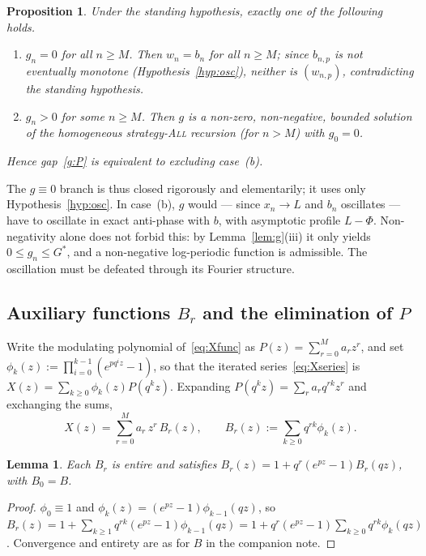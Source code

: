 \documentclass[11pt]{article}
\newtheorem{proposition}[theorem]{Proposition}
\newtheorem{lemma}[theorem]{Lemma}
\theoremstyle{definition}
\newcommand{\All}{\textsc{All}}
\begin{document}
\begin{proposition}\label{prop:dichotomy}
  Under the standing hypothesis, exactly one of the following holds.
  \begin{enumerate}[label=\rm(\alph*),leftmargin=2.4em]
  \item $g_n=0$ for all $n\ge M$. Then $w_n=b_n$ for all $n\ge M$;
    since $b_{n,p}$ is not eventually monotone
    (Hypothesis~\ref{hyp:osc}), neither is $(w_{n,p})$, contradicting
    the standing hypothesis.
  \item $g_n>0$ for some $n\ge M$. Then $g$ is a non-zero,
    non-negative, bounded solution of the homogeneous strategy-\All{}
    recursion (for $n>M$) with $g_0=0$.
  \end{enumerate}
  Hence gap~\ref{g:P} is equivalent to excluding case~(b).
\end{proposition}

The $g\equiv 0$ branch is thus closed rigorously and elementarily; it
uses only Hypothesis~\ref{hyp:osc}. In case~(b), $g$ would --- since
$x_n\to L$ and $b_n$ oscillates --- have to oscillate in exact
anti-phase with $b$, with asymptotic profile $L-\Phi$. Non-negativity
alone does not forbid this: by Lemma~\ref{lem:g}(iii) it only yields
$0\le g_n\le G^\ast$, and a non-negative log-periodic function is
admissible. The oscillation must be defeated through its Fourier
structure.

\subsection{Auxiliary functions $B_r$ and the elimination of $P$}

Write the modulating polynomial of~\eqref{eq:Xfunc} as
$P(z)=\sum_{r=0}^M a_r z^r$, and set
$\phi_k(z):=\prod_{i=0}^{k-1}(e^{pq^iz}-1)$, so that the iterated
series~\eqref{eq:Xseries} is $X(z)=\sum_{k\ge0}\phi_k(z)P(q^kz)$.
Expanding $P(q^kz)=\sum_r a_rq^{rk}z^r$ and exchanging the sums,
\begin{equation}\label{eq:Xdecomp}
  X(z)=\sum_{r=0}^M a_r\,z^r\,B_r(z),
  \qquad
  B_r(z):=\sum_{k\ge0}q^{rk}\phi_k(z).
\end{equation}

\begin{lemma}\label{lem:Br}
  Each $B_r$ is entire and satisfies
  $B_r(z)=1+q^{r}(e^{pz}-1)B_r(qz)$, with $B_0=B$.
\end{lemma}

\begin{proof}
  $\phi_0\equiv1$ and $\phi_k(z)=(e^{pz}-1)\phi_{k-1}(qz)$, so
  $B_r(z)=1+\sum_{k\ge1}q^{rk}(e^{pz}-1)\phi_{k-1}(qz)
  =1+q^{r}(e^{pz}-1)\sum_{k\ge0}q^{rk}\phi_k(qz)$. Convergence and
  entirety are as for $B$ in the companion note.
\end{proof}
\end{document}
